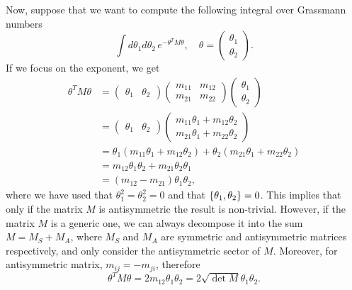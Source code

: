 Now, suppose that we want to compute the following integral over Grassmann numbers
\begin{equation}
    \int d\theta_1 d\theta_2\,e^{-\theta^TM\theta},\quad \theta = 
    \begin{pmatrix}
        \theta_1 \\
        \theta_2
    \end{pmatrix}.
\end{equation}
If we focus on the exponent, we get 
\begin{equation}
    \begin{split}
        \theta^TM\theta &= 
        \begin{pmatrix}
            \theta_1 & \theta_2    
        \end{pmatrix}
        \begin{pmatrix}
            m_{11} & m_{12} \\
            m_{21} & m_{22}
        \end{pmatrix}
        \begin{pmatrix}
        \theta_1 \\
        \theta_2
    \end{pmatrix} \\
    &= 
    \begin{pmatrix}
        \theta_1 & \theta_2    
    \end{pmatrix}
    \begin{pmatrix}
        m_{11}\theta_1 + m_{12}\theta_2 \\
        m_{21}\theta_1 + m_{22}\theta_2 
    \end{pmatrix} \\
    &= \theta_1(m_{11}\theta_1 + m_{12}\theta_2) + \theta_2(m_{21}\theta_1 + m_{22}\theta_2) \\
    &= m_{12}\theta_1\theta_2 + m_{21}\theta_2\theta_1 \\
    &= (m_{12} - m_{21})\theta_1\theta_2,
    \end{split}
\end{equation}
where we have used that $\theta_1^2 = \theta_2^2 = 0$ and that $\{\theta_1,\theta_2\} = 0$. This implies that only if the matrix $M$ is antisymmetric the result is non-trivial. However, if the matrix $M$ is a generic one, we can always decompose it into the sum $M = M_S + M_A$, where $M_S$ and $M_A$ are symmetric and antisymmetric matrices respectively, and only consider the antisymmetric sector of $M$. Moreover, for antisymmetric matrix, $m_{ij} = -m_{ji}$, therefore 
\begin{equation}
    \theta^TM\theta = 2m_{12}\theta_1\theta_2 = 2\sqrt{\det{M}}\theta_1\theta_2.
\end{equation}
